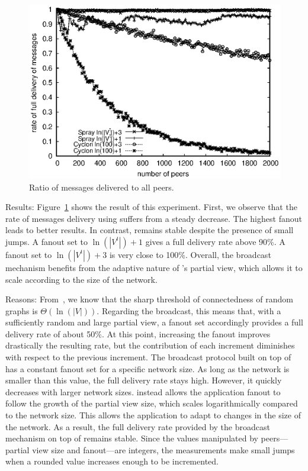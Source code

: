 \begin{asparadesc}
\begin{figure}
  \begin{center}
    \includegraphics[width=\SCALE\textwidth]{img/hardrate.eps}
    \caption{\label{fig:hardrate}Ratio of messages delivered to all peers.}
  \end{center}
\end{figure}

\item [Results:] Figure~\ref{fig:hardrate} shows the result of this
  experiment. First, we observe that the rate of messages delivery
  using \CYCLON suffers from a steady decrease. The highest fanout
  leads to better results. In contrast, \SPRAY remains stable despite
  the presence of small jumps. A fanout set to $\ln(|V^t|)+1$ gives a
  full delivery rate above 90\%. A fanout set to $\ln(|V^t|)+3$ is
  very close to 100\%. Overall, the broadcast mechanism benefits from
  the adaptive nature of \SPRAY's partial view, which allows it to
  scale according to the size of the network.
\item [Reasons:] From~\cite{erdos1959random}, we know that the sharp
  threshold of connectedness of random graphs is
  $\Theta(\ln(|V|))$. Regarding the broadcast, this means that, with a
  sufficiently random and large partial view, a fanout set accordingly
  provides a full delivery rate of about 50\%. At this point,
  increasing the fanout improves drastically the resulting rate, but
  the contribution of each increment diminishes with respect to the
  previous increment. The broadcast protocol built on top of \CYCLON
  has a constant fanout set for a specific network size. As long as
  the network is smaller than this value, the full delivery rate stays
  high. However, it quickly decreases with larger network sizes.
  \SPRAY instead allows the application fanout to follow the growth of
  the partial view size, which scales logarithmically compared to the
  network size. This allows the application to adapt to changes in the
  size of the network. As a result, the full delivery rate provided by
  the broadcast mechanism on top of \SPRAY remains stable. Since the
  values manipulated by peers---partial view size and fanout---are
  integers, the measurements make small jumps when a rounded value
  increases enough to be incremented.
\end{asparadesc}



